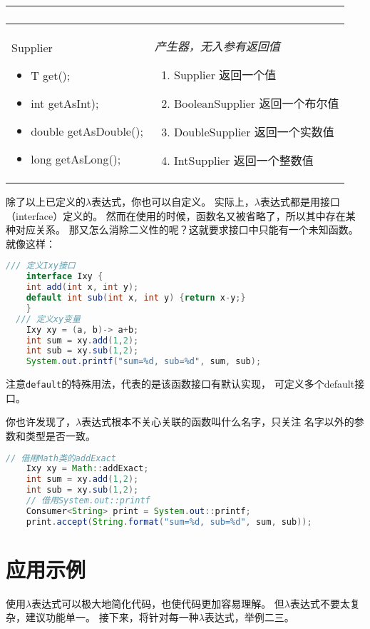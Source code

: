 \begin{longtable}{|p{4cm}|p{8.5cm}|}
\begin{enumerate}
	\end{enumerate} \\
	\hline
	Supplier 
	\begin{itemize}
		\small
		\setlength{\itemindent}{-1.2em}
		\setlength{\itemsep}{0pt}
		\item T get();
		\item int getAsInt);
		\item double getAsDouble();
		\item long getAsLong();
	\end{itemize} & \emph{产生器，无入参有返回值}
	\begin{enumerate}
		\setlength{\itemsep}{0pt}
		\small
		\item Supplier 返回一个值
		\item BooleanSupplier 返回一个布尔值
		\item DoubleSupplier 返回一个实数值
		\item IntSupplier 返回一个整数值
	\end{enumerate} \\
	\hline
\end{longtable}

\noindent
除了以上已定义的$\lambda$表达式，你也可以自定义。
实际上，$\lambda$表达式都是用接口（interface）定义的。
然而在使用的时候，函数名又被省略了，所以其中存在某种对应关系。
那又怎么消除二义性的呢？这就要求接口中只能有一个未知函数。
就像这样：

\begin{lstlisting}[language=java]
	/// 定义Ixy接口
	interface Ixy {
    int add(int x, int y);
    default int sub(int x, int y) {return x-y;}
	}
  /// 定义xy变量
	Ixy xy = (a, b)-> a+b;
	int sum = xy.add(1,2);
	int sub = xy.sub(1,2);
	System.out.printf("sum=%d, sub=%d", sum, sub);
\end{lstlisting}
\noindent
注意\lstinline{default}的特殊用法，代表的是该函数接口有默认实现，
可定义多个default接口。

你也许发现了，$\lambda$表达式根本不关心关联的函数叫什么名字，只关注
名字以外的参数和类型是否一致。
\begin{lstlisting}[language=java]
	// 借用Math类的addExact
	Ixy xy = Math::addExact;
	int sum = xy.add(1,2);
	int sub = xy.sub(1,2);
	// 借用System.out::printf
	Consumer<String> print = System.out::printf;
	print.accept(String.format("sum=%d, sub=%d", sum, sub));
\end{lstlisting}

\section{应用示例}
使用$\lambda$表达式可以极大地简化代码，也使代码更加容易理解。
但$\lambda$表达式不要太复杂，建议功能单一。
接下来，将针对每一种$\lambda$表达式，举例二三。

